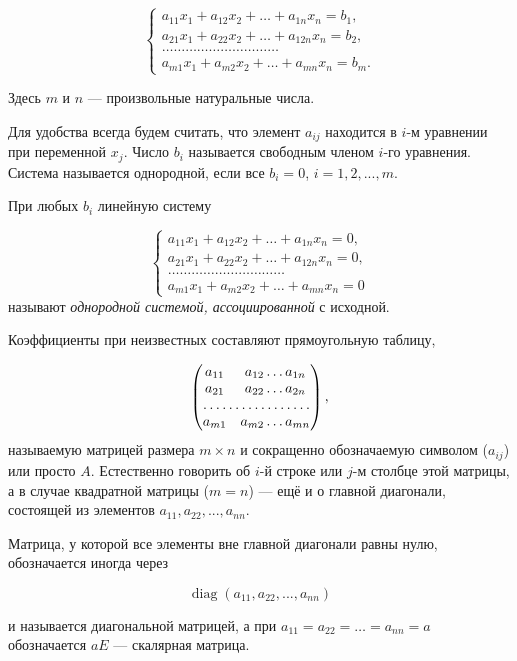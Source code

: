 \documentclass[12pt,english,russian]{article}
\DeclareMathOperator{\diag}{diag}
\begin{document}
	$$
		\begin{cases}
			a_{11}x_1 + a_{12}x_2 + \dots + a_{1n}x_n = b_1,\\
			a_{21}x_1 + a_{22}x_2 + \dots + a_{12n}x_n = b_2,\\
			\dots \dots \dots \dots \dots \dots \dots \dots \dots \dots\\
			a_{m1}x_1 + a_{m2}x_2 + \dots + a_{mn}x_n = b_m.
		\end{cases}
	$$

	Здесь $m$ и $n$ --- произвольные натуральные числа.

	Для удобства всегда будем считать, что элемент
	$a_{ij}$ находится в $i$-м уравнении при переменной $x_j$. 
	Число $b_i$ называется свободным членом $i$-го уравнения. Система называется
	однородной, если все $b_i = 0$, $i = 1, 2, . . . , m$.

	При любых $b_i$ линейную систему

	$$
		\begin{cases}
			a_{11}x_1 + a_{12}x_2 + \dots + a_{1n}x_n = 0,\\
			a_{21}x_1 + a_{22}x_2 + \dots + a_{12n}x_n = 0,\\
			\dots \dots \dots \dots \dots \dots \dots \dots \dots \dots\\
			a_{m1}x_1 + a_{m2}x_2 + \dots + a_{mn}x_n = 0
		\end{cases}
	$$
	называют
	\textit{однородной системой, ассоциированной}
	с исходной.

	Коэффициенты при неизвестных составляют прямоугольную
	таблицу,

	$$
			\begin{pmatrix}
				 a_{11} & a_{12} \dots a_{1n}\\
				 a_{21} & a_{22} \dots a_{2n}\\
				 \hdotsfor {2} \\
				 a_{m1} & a_{m2} \dots a_{mn}
			  \end{pmatrix},
	$$
	называемую матрицей размера $m \times n$ и сокращенно обозначаемую символом 
	($a_{ij}$) или просто $A$. Естественно говорить об $i$-й строке или $j$-м 
	столбце этой матрицы, а в случае квадратной матрицы ($m = n$) --- ещё и о главной диагонали, состоящей из
	элементов $a_{11}, a_{22}, . . . , a_{nn}$.

	Матрица, у которой все элементы вне главной диагонали равны
	нулю, обозначается иногда через

	$$\diag(a_{11}, a_{22}, . . . , a_{nn})$$

	и называется диагональной матрицей, а при $a_{11} = a_{22} = \dots = a_{nn} = a$
	обозначается $aE$ --- скалярная матрица.
\end{document}
